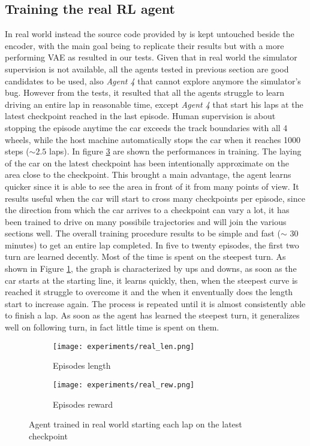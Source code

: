 \subsection{Training the real RL agent}
In real world instead the source code provided by \citet{DBLP:journals/corr/abs-2008-00715} is kept untouched beside the encoder, with the main goal being to replicate their results but with a more performing VAE as resulted in our tests. Given that in real world the simulator supervision is not available, all the agents tested in previous section are good candidates to be used, also \textit{Agent 4} that cannot explore anymore the simulator's bug. However from the tests, it resulted that all the agents struggle to learn driving an entire lap in reasonable time, except\textit{ Agent 4 }that start his laps at the latest checkpoint reached in the last episode. Human supervision is about stopping the episode anytime the car exceeds the track boundaries with all 4 wheels, while the host machine automatically stops the car when it reaches 1000 steps ($\sim 2.5$ laps). In figure \ref{fig:realresult} are shown the performances in training. The laying of the car on the latest checkpoint has been intentionally approximate on the area close to the checkpoint. This brought a main advantage, the agent learns quicker since it is able to see the area in front of it from many points of view. It results useful when the car will start to cross many checkpoints per episode, since the direction from which the car arrives to a checkpoint can vary a lot, it has been trained to drive on many possibile trajectories and will join the various sections well. The overall training procedure results to be simple and fast ($\sim$ 30 minutes) to get an entire lap completed. In five to twenty episodes, the first two turn are learned decently. Most of the time is spent on the steepest turn. As shown in Figure \ref{fig:rlen}, the graph is characterized by ups and downs, as soon as the car starts at the starting line, it learns quickly, then, when the steepest curve is reached it struggle to overcome it and the when it enventually does the length start to increase again. The process is repeated until it is almost consistently able to finish a lap. As soon as the agent has learned the steepest turn, it generalizes well on following turn, in fact little time is spent on them.

\begin{figure}[h]
  \centering
  \begin{subfigure}{.5\linewidth}
      \centering
      \texttt{[image: experiments/real\_len.png]}
      \caption{Episodes length}\label{fig:rlen}
  \end{subfigure}%
      \hfill
  \begin{subfigure}{.5\linewidth}
      \centering
      \texttt{[image: experiments/real\_rew.png]}
      \caption{Episodes reward}\label{fig:rrew}
  \end{subfigure}
  \caption{Agent trained in real world starting each lap on the latest checkpoint}
  \label{fig:realresult}
\end{figure}

